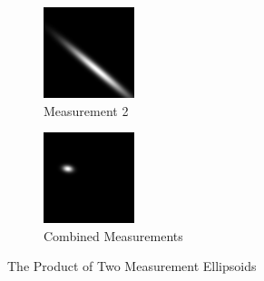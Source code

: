 \documentclass{article}
\begin{document}
\begin{figure}
\begin{subfigure}{.3\textwidth}
          \includegraphics[width=.8\linewidth]{images/GaussianLine2.png}
          \caption{Measurement 2}
          \label{fig:uncProdsub2}
        \end{subfigure}
        \begin{subfigure}{.3\textwidth}
          \centering
          \includegraphics[width=.8\linewidth]{images/GaussianLine3.png}
          \caption{Combined Measurements}
          \label{fig:uncProdsub3}
        \end{subfigure}
        \caption{The Product of Two Measurement Ellipsoids}
        \label{fig:uncProd}
        \end{figure}
\end{document}
